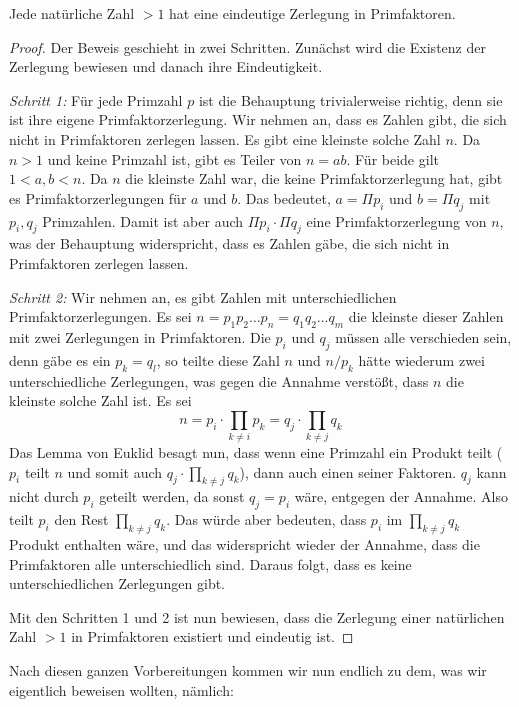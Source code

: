 \begin{lemma}\label{lem:prim}
Jede natürliche Zahl $>1$ hat eine eindeutige Zerlegung in Primfaktoren.
\end{lemma}
\begin{proof}
Der Beweis geschieht in zwei Schritten. Zunächst wird die Existenz der Zerlegung bewiesen und danach ihre Eindeutigkeit.

\noindent\textsl{Schritt 1:}
Für jede Primzahl $p$ ist die Behauptung trivialerweise richtig, denn sie ist ihre eigene Primfaktorzerlegung. 
Wir nehmen an, dass es Zahlen gibt, die sich nicht in Primfaktoren zerlegen lassen. Es gibt eine kleinste solche Zahl $n$. Da $n>1$ und keine Primzahl ist, gibt es Teiler von $n=ab$. Für beide gilt $1<a,b<n$. Da $n$ die kleinste Zahl war, die keine Primfaktorzerlegung hat, gibt es Primfaktorzerlegungen für $a$ und $b$. Das bedeutet, $a = \Pi p_i$ und $b=\Pi q_j$ mit $p_i,q_j$ Primzahlen. Damit ist aber auch $\Pi p_i \cdot \Pi q_j$ eine Primfaktorzerlegung von $n$, was der Behauptung widerspricht, dass es Zahlen gäbe, die sich nicht in Primfaktoren zerlegen lassen.

\noindent\textsl{Schritt 2:}
Wir nehmen an, es gibt Zahlen mit unterschiedlichen Primfaktorzerlegungen. Es sei $n=p_1 p_2 \dots p_n = q_1 q_2 \dots q_m$ die kleinste dieser Zahlen mit zwei Zerlegungen in Primfaktoren. Die $p_i$ und $q_j$ müssen alle verschieden sein, denn gäbe es ein $p_k=q_l$, so teilte diese Zahl $n$ und $n/p_k$ hätte wiederum zwei unterschiedliche Zerlegungen, was gegen die Annahme verstößt, dass $n$ die kleinste solche Zahl ist.
Es sei 
\[
n= p_i\cdot \prod_{k\ne i} p_k= q_j\cdot \prod_{k\ne j} q_k
\]
Das Lemma von Euklid besagt nun, dass wenn eine Primzahl ein Produkt teilt ($p_i$ teilt $n$ und somit auch $q_j\cdot \prod_{k\ne j} q_k$), dann auch einen seiner Faktoren. $q_j$ kann nicht durch $p_i$ geteilt werden, da sonst $q_j=p_i$ wäre, entgegen der Annahme. Also teilt $p_i$ den Rest $\prod_{k\ne j} q_k$. Das würde aber bedeuten, dass $p_i$ im $\prod_{k\ne j} q_k$ Produkt enthalten wäre, und das widerspricht wieder der Annahme, dass die Primfaktoren alle unterschiedlich sind. Daraus folgt, dass es keine unterschiedlichen Zerlegungen gibt.

Mit den Schritten 1 und 2 ist nun bewiesen, dass die Zerlegung einer natürlichen Zahl $>1$ in Primfaktoren existiert und eindeutig ist. 

\end{proof}

Nach diesen ganzen Vorbereitungen kommen wir nun endlich zu dem, was wir eigentlich beweisen wollten, nämlich:

